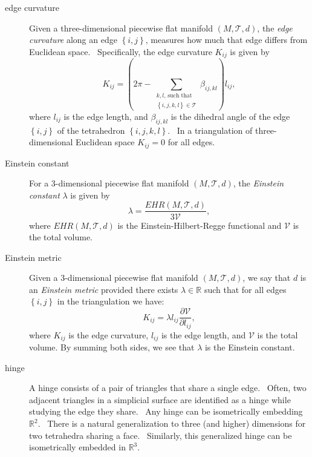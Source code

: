 \begin{description}
\item[edge curvature] Given a three-dimensional piecewise flat manifold $%
\left( M,\mathcal{T},d\right) $, the \textit{edge curvature} along an edge $%
\left\{ i,j\right\} $, measures how much that edge differs from Euclidean
space. \ Specifically, the edge curvature $K_{ij}$ is given by 
\begin{equation*}
K_{ij}=\left( 2\pi -\sum\limits_{\substack{ k,l\text{, such that}  \\ %
\left\{ i,j,k,l\right\} \in \mathcal{T}}}\beta _{ij,kl}\right) l_{ij},
\end{equation*}%
where $l_{ij}$ is the edge length, and $\beta _{ij,kl}$ is the dihedral
angle of the edge $\left\{ i,j\right\} $ of the tetrahedron $\left\{
i,j,k,l\right\} $. \ In a triangulation of three-dimensional Euclidean space 
$K_{ij}=0$ for all edges. \ 

\item[Einstein constant] For a 3-dimensional piecewise flat manifold $\left(
M,\mathcal{T},d\right) $, the \textit{Einstein constant} $\lambda $ is given
by%
\begin{equation*}
\lambda =\frac{EHR\left( M,\mathcal{T},d\right) }{3\mathcal{V}},
\end{equation*}%
where $EHR\left( M,\mathcal{T},d\right) $ is the Einstein-Hilbert-Regge
functional and $\mathcal{V}$ is the total volume.

\item[Einstein metric] Given a 3-dimensional piecewise flat manifold $\left(
M,\mathcal{T},d\right) $, we say that $d$ is an \textit{Einstein metric}
provided there exists $\lambda \in \mathbb{R}$ such that for all edges $%
\left\{ i,j\right\} $ in the triangulation we have:%
\begin{equation*}
K_{ij}=\lambda l_{ij}\frac{\partial \mathcal{V}}{\partial l_{ij}},
\end{equation*}%
where $K_{ij}$ is the edge curvature, $l_{ij}$ is the edge length, and $%
\mathcal{V}$ is the total volume. By summing both sides, we see that $%
\lambda $ is the Einstein constant.

\item[hinge] A hinge consists of a pair of triangles that share a single
edge. \ Often, two adjacent triangles in a simplicial surface are identified
as a hinge while studying the edge they share. \ Any hinge can be
isometrically embedding $%
\mathbb{R}
^{2}$. \ There is a natural generalization to three (and higher) dimensions
for two tetrahedra sharing a face. \ Similarly, this generalized hinge can
be isometrically embedded in $%
\mathbb{R}
^{3}$. \ 


\end{description}
